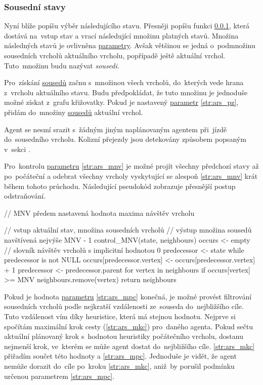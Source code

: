 \subsubsection{Sousední stavy}\label{subsubsec:sousedni_stavy}

Nyní blíže popíšu výběr následujícího stavu.
Přesněji popíšu funkci \ref{subsubsec:sousedni_stavy},
která dostává na~vstup stav a vrací následující množinu platných stavů.
Množina následných stavů je ovlivněna \hyperref[subsubsec:ars_parametry]{parametry}.
Avšak většinou se jedná o~podmnožinu sousedních vrcholů aktuálního vrcholu, popřípadě ještě aktuální vrchol.
Tuto~množinu budu nazývat \emph{sousedi}.

Pro~získání \hyperref[str:ars_sousedi]{sousedů} začnu s~množinou všech vrcholů,
do~kterých vede hrana z~vrcholu aktuálního stavu.
Budu předpokládat, že tuto množinu je jednoduše možné získat z~grafu křižovatky.
Pokud je nastavený \hyperref[subsubsec:ars_parametry]{parametr} \ref{str:ars_pz},
přidám do~množiny \hyperref[str:ars_sousedi]{sousedů} aktuální vrchol.

Agent se nesmí srazit s~žádným jiným naplánovaným agentem při~jízdě do~sousedního vrcholu.
Kolizní přejezdy jsou detekovány způsobem popsaným v~sekci .

Pro~kontrolu \hyperref[subsubsec:ars_parametry]{parametru} \ref{str:ars_mnv}
je možné projít všechny předchozí stavy až po~počáteční
a odebrat všechny vrcholy vyskytující se alespoň \ref{str:ars_mnv} krát během tohoto průchodu.
Následující pseudokód zobrazuje přesnější postup odstraňování.

\begin{code}[fontsize=\footnotesize]
// MNV předem nastavená hodnota maxima návštěv vrcholu

// vstup aktuální stav, množina sousedních vrcholů
// výstup množina sousedů navštívená nejvýše MNV - 1
control_MNV(state, neighbours)
  occurs <- empty // slovník návštěv vrcholů s implicitní hodnotou 0
  predecessor <- state
  while predecessor is not NULL
    occurs[predecessor.vertex] <- occurs[predecessor.vertex] + 1
    predecessor <- predecessor.parent
  for vertex in neighbours
    if occurs[vertex] >= MNV
      neighbours.remove(vertex)
  return neighbours
\end{code}

Pokud je hodnota \hyperref[subsubsec:ars_parametry]{parametru} \ref{str:ars_mpc} konečná,
je možné provést filtrování sousedních vrcholů podle nejkratší vzdálenosti ze~souseda do~nejbližšího cíle.
Tuto vzdálenost vím díky heuristice, která má stejnou hodnotu.
Nejprve si spočítám maximální krok cesty (\ref{str:ars_mkc}) pro~daného agenta.
Pokud sečtu aktuální plánovaný krok s~hodnotou heuristiky počátečního vrcholu, dostanu nejmenší krok,
ve~kterém se může agent dostat do~nejbližšího cíle.
\ref{str:ars_mkc} přiřadím součet této hodnoty a \ref{str:ars_mpc}.
Jednoduše je vidět, že agent nemůže dorazit do~cíle po~kroku \ref{str:ars_mkc},
aniž~by porušil podmínku určenou parametrem \ref{str:ars_mpc}.

